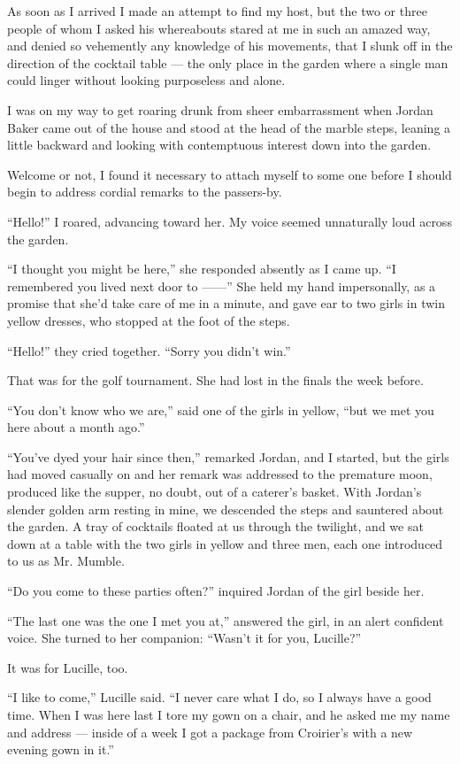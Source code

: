 \documentclass{znotebook}
\begin{document}
As soon as I arrived I made an attempt to find my host, but the two or three people of whom I asked his whereabouts stared at me in such an amazed way, and denied so vehemently any knowledge of his movements, that I slunk off in the direction of the cocktail table — the only place in the garden where a single man could linger without looking purposeless and alone.

I was on my way to get roaring drunk from sheer embarrassment when Jordan Baker came out of the house and stood at the head of the marble steps, leaning a little backward and looking with contemptuous interest down into the garden.

Welcome or not, I found it necessary to attach myself to some one before I should begin to address cordial remarks to the passers-by.

``Hello!'' I roared, advancing toward her. My voice seemed unnaturally loud across the garden.

``I thought you might be here,'' she responded absently as I came up. ``I remembered you lived next door to ——'' She held my hand impersonally, as a promise that she’d take care of me in a minute, and gave ear to two girls in twin yellow dresses, who stopped at the foot of the steps.

``Hello!'' they cried together. ``Sorry you didn’t win.''

That was for the golf tournament. She had lost in the finals the week before.

``You don’t know who we are,'' said one of the girls in yellow, ``but we met you here about a month ago.''

``You’ve dyed your hair since then,'' remarked Jordan, and I started, but the girls had moved casually on and her remark was addressed to the premature moon, produced like the supper, no doubt, out of a caterer’s basket. With Jordan’s slender golden arm resting in mine, we descended the steps and sauntered about the garden. A tray of cocktails floated at us through the twilight, and we sat down at a table with the two girls in yellow and three men, each one introduced to us as Mr. Mumble.

``Do you come to these parties often?'' inquired Jordan of the girl beside her.

``The last one was the one I met you at,'' answered the girl, in an alert confident voice. She turned to her companion: ``Wasn’t it for you, Lucille?''

It was for Lucille, too.

``I like to come,'' Lucille said. ``I never care what I do, so I always have a good time. When I was here last I tore my gown on a chair, and he asked me my name and address — inside of a week I got a package from Croirier’s with a new evening gown in it.''
\end{document}
